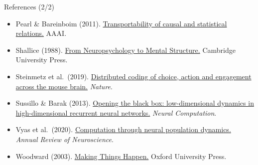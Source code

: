 \documentclass[aspectratio=169,11pt]{beamer}
\begin{document}
\begin{frame}{References (2/2)}
\vspace{-0.3em}
{\scriptsize
\begin{itemize}\setlength\itemsep{0pt}
  \item Pearl \& Bareinboim (2011). \href{https://arxiv.org/abs/1203.3519}{Transportability of causal and statistical relations.} AAAI.
  \item Shallice (1988). \href{https://doi.org/10.1017/CBO9780511526817}{From Neuropsychology to Mental Structure.} Cambridge University Press.
  \item Steinmetz et al.\ (2019). \href{https://doi.org/10.1038/s41586-019-1787-x}{Distributed coding of choice, action and engagement across the mouse brain.} \textit{Nature}.
  \item Sussillo \& Barak (2013). \href{https://doi.org/10.1162/NECO_a_00409}{Opening the black box: low-dimensional dynamics in high-dimensional recurrent neural networks.} \textit{Neural Computation}.
  \item Vyas et al.\ (2020). \href{https://doi.org/10.1146/annurev-neuro-092619-094115}{Computation through neural population dynamics.} \textit{Annual Review of Neuroscience}.
  \item Woodward (2003). \href{https://doi.org/10.1093/0195155270.001.0001}{Making Things Happen.} Oxford University Press.
\end{itemize}
}
\end{frame}
\end{document}
